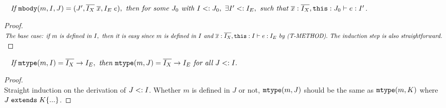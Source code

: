 \begin{lemma}~\label{lemma0}
$\textit{If } \texttt{mbody}(m, I, J) = (J', \overline{I_X} \; \overline{x}, I_E \; e), 
 \textit{ then for some } J_0 \textit{ with } I <: J_0, \  \exists I' <: I_E, \textit{ such that }  
 \overline{x}:\overline{I_X}, \texttt{this}:J_0 \; {\vdash} \; e : I' $.
\end{lemma}

 \begin{proof}~\\
 $\textit{The base case: if } m \textit{ is defined in } I, \textit{ then it is easy since } m 
 \textit{ is defined in } I \textit{ and } 
 \overline{x}:\overline{I_X}, \texttt{this} : I \; {\vdash} \; e : I_E \textit{ by (T-METHOD)}.
 \textit{ The induction step is also straightforward. }
 $
 \end{proof}


\begin{lemma}~\label{lemma2}
$\textit{If } \texttt{mtype}(m, I) = \overline{I_X} \rightarrow I_E, \textit{ then } \texttt{mtype}(m, J) = \overline{I_X} \rightarrow I_E 
\textit{ for all } J <: I.
$
\begin{proof}~\\
Straight induction on the derivation of $J <: I$. Whether $m$ is defined in $J$ or not, $\texttt{mtype}(m, J)$ should 
be the same as $\texttt{mtype}(m, K)$ where $J \; \texttt{extends} \; K \{...\}$.
\end{proof}
\end{lemma}


